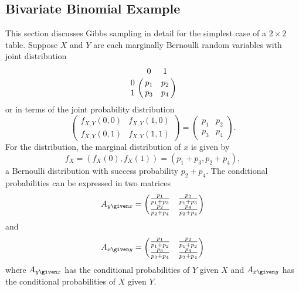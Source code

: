 \documentclass[12pt]{article}
\begin{document}
\subsection*{Bivariate Binomial Example}

This section discusses Gibbs sampling in detail for the simplest case of
a \( 2 \times 2 \) table.  Suppose \( X \) and \( Y \) are each
marginally Bernoulli random variables with joint distribution
\[
    \bordermatrix{ & 0 & 1 \cr
    0 & p_1 & p_2 \cr
    1 & p_3 & p_4}
\] or in terms of the joint probability distribution
\[
    \begin{pmatrix}
        f_{X,Y}(0,0) & f_{X,Y}(1,0) \\
        f_{X,Y}(0,1) & f_{X,Y}(1,1)
    \end{pmatrix}
    =
    \begin{pmatrix}
        p_1 & p_2 \\
        p_3 & p_4
    \end{pmatrix}
    .
\] For the distribution, the marginal distribution of \( x \) is given
by
\[
    f_X = (f_X(0), f_X(1)) = (p_1 + p_3, p_2 + p_4),
\] a Bernoulli distribution with success probability \( p_2 + p_4 \).
The conditional probabilities can be expressed in two matrices
\[
    A_{y \given x} =
    \begin{pmatrix}
        \frac{p_1}{p_1 + p_3} & \frac{p_3}{p_1 + p_3} \\
        \frac{p_2}{p_2 + p_4} & \frac{p_4}{p_2 + p_4}
    \end{pmatrix}
\] and
\[
    A_{x \given y} =
    \begin{pmatrix}
        \frac{p_1}{p_1 + p_2} & \frac{p_2}{p_1 + p_2} \\
        \frac{p_3}{p_3 + p_4} & \frac{p_4}{p_3 + p_4}
    \end{pmatrix}
\] where \( A_{y \given x} \) has the conditional probabilities of \( Y \)
given \( X \) and \( A_{x \given y} \) has the conditional probabilities
of \( X \) given \( Y \).
\end{document}

